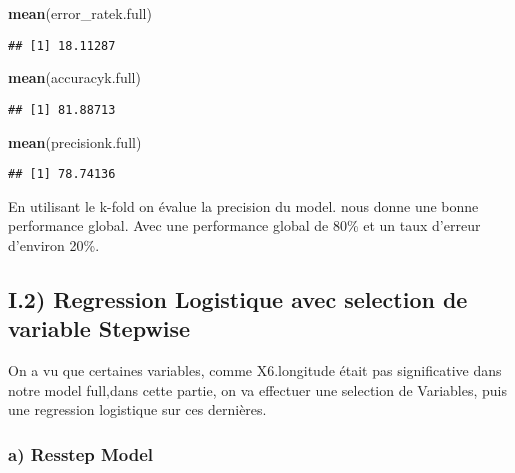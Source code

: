 \documentclass[
]{article}
\newenvironment{Shaded}{\begin{snugshade}}{\end{snugshade}}
\newcommand{\KeywordTok}[1]{\textcolor[rgb]{0.13,0.29,0.53}{\textbf{#1}}}
\newcommand{\NormalTok}[1]{#1}
\begin{document}
\begin{Shaded}
\begin{Highlighting}[]
\KeywordTok{mean}\NormalTok{(error_ratek.full)}
\end{Highlighting}
\end{Shaded}

\begin{verbatim}
## [1] 18.11287
\end{verbatim}

\begin{Shaded}
\begin{Highlighting}[]
\KeywordTok{mean}\NormalTok{(accuracyk.full)}
\end{Highlighting}
\end{Shaded}

\begin{verbatim}
## [1] 81.88713
\end{verbatim}

\begin{Shaded}
\begin{Highlighting}[]
\KeywordTok{mean}\NormalTok{(precisionk.full)}
\end{Highlighting}
\end{Shaded}

\begin{verbatim}
## [1] 78.74136
\end{verbatim}

En utilisant le k-fold on évalue la precision du model. nous donne une
bonne performance global. Avec une performance global de 80\% et un taux
d'erreur d'environ 20\%.

\hypertarget{i.2-regression-logistique-avec-selection-de-variable-stepwise}{%
\subsection{I.2) Regression Logistique avec selection de variable
Stepwise}\label{i.2-regression-logistique-avec-selection-de-variable-stepwise}}

On a vu que certaines variables, comme X6.longitude était pas
significative dans notre model full,dans cette partie, on va effectuer
une selection de Variables, puis une regression logistique sur ces
dernières.

\hypertarget{a-resstep-model}{%
\subsubsection{a) Resstep Model}\label{a-resstep-model}}
\end{document}
